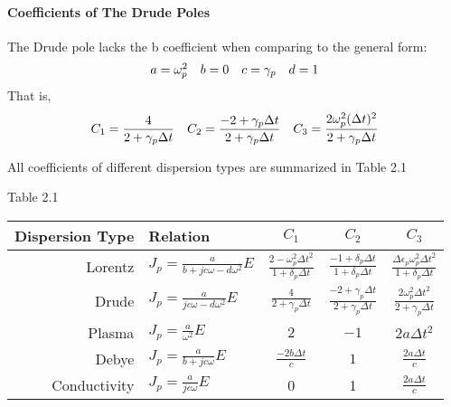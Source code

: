 \paragraph{\msjh Coefficients of The Drude Poles}
The Drude pole lacks the b coefficient when comparing to the general form:
\begin{equation*}
  \begin{array}{@{}llll@{}}
    a = \omega_p^2 &
    b = 0 &
    c = \gamma_p &
    d = 1
  \end{array}
\end{equation*}
That is,
\begin{gather*}
  \begin{array}{@{}lll@{}}
    C_1 = \displaystyle\frac{4}{2+ \gamma_p\Delta t} &
    C_2 = \displaystyle\frac{-2+\gamma_p\Delta t}{2+\gamma_p\Delta t} &
    C_3 = \displaystyle\frac{2\omega_p^2(\Delta t)^2}{2+\gamma_p\Delta t}
  \end{array}
\end{gather*}





All coefficients of different dispersion types are summarized in Table 2.1
\begin{center}
  Table 2.1\\[0.3cm]
  \begin{tabular}[c]{rlccc}
    \hline
    Dispersion Type & Relation & $C_1$ & $C_2$ & $C_3$ \\[0.1cm]
    \hline\noalign{\smallskip}
    Lorentz 
    & $J_p= \displaystyle\frac{a}{b + jc\omega - d\omega^2}E$ 
    & $\displaystyle\frac{2-\omega_p^2\Delta t^2}{1+\delta_p\Delta t}$ 
    & $\displaystyle\frac{-1 + \delta_p\Delta t}{1+\delta_p\Delta t}$  
    & $\displaystyle\frac{\Delta\epsilon_p\omega_p^2\Delta t^2}{1+\delta_p\Delta t}$ \\[0.5cm]

    Drude 
    & $J_p = \displaystyle\frac{a}{jc\omega - d\omega^2}E$ 
    & $\displaystyle\frac{ 4}{ 2+\gamma_p\Delta t}$ 
    & $\displaystyle\frac{ -2+\gamma_p\Delta t}{ 2+\gamma_p\Delta t}$ 
    & $\displaystyle\frac{ 2\omega_p^2\Delta t^2}{ 2+\gamma_p \Delta t}$\\[0.5cm]

    Plasma 
    & $J_p = \displaystyle\frac{a}{\omega^2} E$ 
    & $2$ 
    & $-1$ 
    & $2a\Delta t^2$\\[0.5cm]

    Debye
    & $J_p = \displaystyle\frac{a}{b+jc\omega} E$ 
    & $\displaystyle\frac{-2b\Delta t}{c}$ 
    & $1$ 
    & $\displaystyle\frac{2a\Delta t}{c}$\\[0.5cm]

    Conductivity
    & $J_p = \displaystyle\frac{a}{jc\omega}E$ 
    & 0 
    & 1 
    & $\displaystyle\frac{2a\Delta t}{c}$\\[0.3cm]
    \hline
  \end{tabular}
\end{center}


